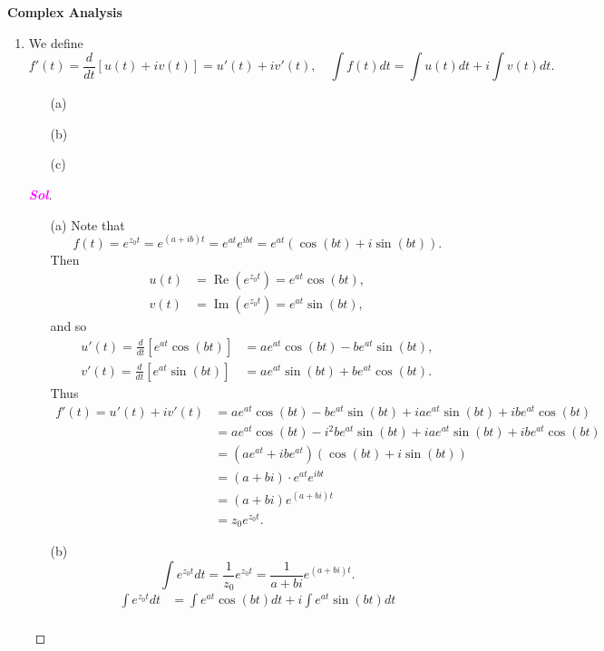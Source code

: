 \documentclass{article}
\theoremstyle{definition}
\newcommand{\of}[1]{\left( #1 \right)}
\newcommand{\sol}{\textcolor{magenta}{\bf Sol}}
\renewcommand{\Re}{\operatorname{Re}}
\renewcommand{\Im}{\operatorname{Im}}
\begin{document}
\begin{center}
	\huge\textbf{Complex Analysis}\\
	\vspace{0.5em}
\end{center}

\begin{enumerate}
	\item We define \[
	f'\of{t}=\frac{d}{dt}\left[u\of{t}+iv\of{t}\right] = u'\of{t}+iv'\of{t},\quad
	\int f\of{t}dt = \int u\of{t}dt + i\int v\of{t}dt.
	\] \begin{itemize}
		\item[(a)]
		\item[(b)]
		\item[(c)]
	\end{itemize}
	\begin{proof}[\sol]
		\begin{itemize}
			\item[(a)] Note that \[
			f\of{t}=e^{z_0t}=e^{\of{a+ib}t}=e^{at}e^{i bt}=e^{at}\of{\cos\of{bt}+i\sin\of{bt}}.
			\] Then \begin{align*}
				u\of{t} &=\Re\of{e^{z_0t}}=e^{at}\cos\of{bt},\\
				v\of{t} &=\Im\of{e^{z_0t}}=e^{at}\sin\of{bt},
			\end{align*} and so \begin{align*}
				u'\of{t}=\frac{d}{dt}\left[e^{at}\cos\of{bt}\right]&=ae^{at}\cos\of{bt}-be^{at}\sin\of{bt},\\
				v'\of{t}=\frac{d}{dt}\left[e^{at}\sin\of{bt}\right]&=ae^{at}\sin\of{bt}+be^{at}\cos\of{bt}.
			\end{align*} Thus \begin{align*}
				f'\of{t}=u'\of{t}+iv'\of{t}&=ae^{at}\cos\of{bt}-be^{at}\sin\of{bt}+iae^{at}\sin\of{bt}+ibe^{at}\cos\of{bt}\\
				&=ae^{at}\cos\of{bt}-i^2be^{at}\sin\of{bt}+iae^{at}\sin\of{bt}+ibe^{at}\cos\of{bt}\\
				&=(ae^{at}+ibe^{at})\of{\cos\of{bt}+i\sin\of{bt}}\\
				&=\of{a+bi}\cdot e^{at}e^{ibt}\\
				&=\of{a+bi}e^{\of{a+bi}t}\\
				&=z_0e^{z_0t}.
			\end{align*}
			\item[(b)] \[
			\int e^{z_0t}dt = \frac{1}{z_0}e^{z_0t}=\frac{1}{a+bi}e^{\of{a+bi}t}.
			\]\begin{align*}
				\int e^{z_0t}dt&=\int e^{at}\cos\of{bt}dt +i\int e^{at}\sin\of{bt}dt\\

\end{align*}
\end{itemize}
\end{proof}
\end{enumerate}
\end{document}
